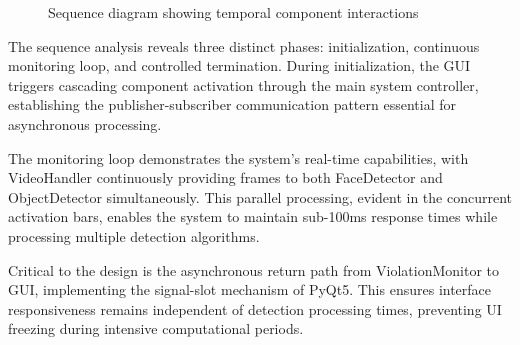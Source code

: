 \documentclass[conference]{IEEEtran}
\begin{document}
\begin{figure}[H]
    \caption{Sequence diagram showing temporal component interactions}
\end{figure}

The sequence analysis reveals three distinct phases: initialization, continuous monitoring loop, and controlled termination. During initialization, the GUI triggers cascading component activation through the main system controller, establishing the publisher-subscriber communication pattern essential for asynchronous processing.

The monitoring loop demonstrates the system's real-time capabilities, with VideoHandler continuously providing frames to both FaceDetector and ObjectDetector simultaneously. This parallel processing, evident in the concurrent activation bars, enables the system to maintain sub-100ms response times while processing multiple detection algorithms.

Critical to the design is the asynchronous return path from ViolationMonitor to GUI, implementing the signal-slot mechanism of PyQt5. This ensures interface responsiveness remains independent of detection processing times, preventing UI freezing during intensive computational periods.
\end{document}
